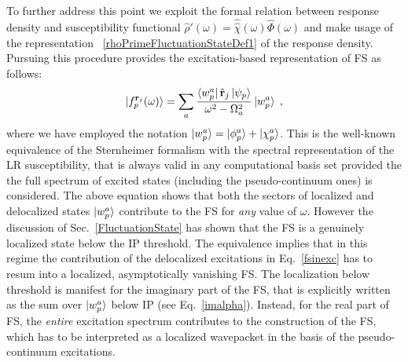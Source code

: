 \documentclass[reprint,aps,prb]{revtex4-1}
\newcommand{\be}{\begin{equation}}
\newcommand{\ee}{\end{equation}}
\newcommand{\lb}{\label}
\newcommand{\op}[1]{\hat {#1}}
\newcommand{\sop}[1]{\op{\op {#1}}}
\newcommand{\dm}{\op{\rho}}
\begin{document}
To further address this point we exploit the formal relation between response density and susceptibility functional %
$\dm'(\omega) = \sop \chi(\omega)\op\Phi(\omega)$ and make usage of the representation ~\eqref{rhoPrimeFluctuationStateDef1} of the response density. Pursuing this procedure provides the excitation-based
representation of FS as follows:
\be\lb{fsinexc}
\ket{f_p^{\mathbf r_j}(\omega)}=
\sum_a \frac{\bra{w_p^a} \op{\mathbf r}_j \ket{\psi_p}}{\omega^2 - \Omega_a^2}
\ket{w_p^a}\;,
\ee
where we have employed the notation $\ket{w_p^a}=\ket{\phi_p^a}+\ket{\chi_p^a}$.
This is the well-known equivalence of the Sternheimer formalism with the spectral representation of the LR susceptibility,
that is always valid in any computational basis set provided the the full spectrum of excited states (including the pseudo-continuum ones) is considered.
The above equation shows that both the sectors of localized and delocalized states $\ket{w_p^a}$ contribute to the FS for \emph{any} value of $\omega$.
However the discussion of Sec.~\ref{FluctuationState} has shown that the FS is a genuinely localized state below the IP threshold.
The equivalence implies that in this regime the contribution of the delocalized excitations in Eq.~\eqref{fsinexc} has to resum into a localized, asymptotically vanishing FS.
The localization below threshold is manifest for the imaginary part of the FS, that is explicitly written as the sum over $\ket{w_p^a}$ below IP (see Eq.~\eqref{imalpha}). Instead, for the real part of FS, the \emph{entire} excitation spectrum contributes to the construction of the FS,
which has to be interpreted as a localized wavepacket in the basis of the pseudo-continuum excitations.
\end{document}
